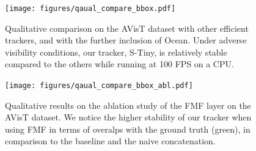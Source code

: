 \begin{figure}
  \hspace*{-35pt}
    \centering
     \texttt{[image: figures/qaual\_compare\_bbox.pdf]}
     \caption{Qualitative comparison on the AVisT \cite{noman2022avist} dataset with other efficient trackers, and with the further inclusion of Ocean. Under adverse visibility conditions, our tracker, S-Tiny, is relatively stable compared to the others while running at 100 FPS on a CPU.}
     \label{fig:qual_compare_bbox}
\end{figure}

\begin{figure}
	\hspace*{-35pt}
    \centering
     \texttt{[image: figures/qaual\_compare\_bbox\_abl.pdf]}
     \caption{ Qualitative results on the ablation study of the FMF layer on the AVisT \cite{noman2022avist} dataset. We notice the higher stability of our tracker when using FMF in terms of overalps with the ground truth (green), in comparison to the baseline and the naive concatenation.}
     \label{fig:qual_compare_bbox_abl}
\end{figure}
  